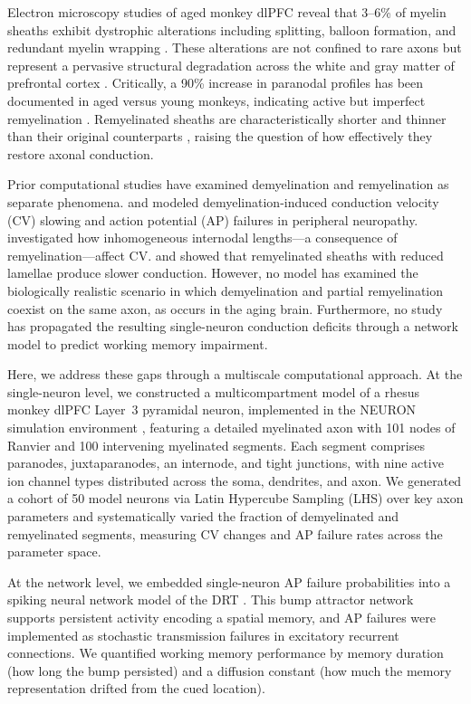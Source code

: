 \documentclass[11pt]{article}
\begin{document}
Electron microscopy studies of aged monkey dlPFC reveal that 3--6\% of myelin sheaths exhibit dystrophic alterations including splitting, balloon formation, and redundant myelin wrapping \citep{peters2002, bowley2010}. These alterations are not confined to rare axons but represent a pervasive structural degradation across the white and gray matter of prefrontal cortex \citep{peters2009}. Critically, a 90\% increase in paranodal profiles has been documented in aged versus young monkeys, indicating active but imperfect remyelination \citep{peters2009}. Remyelinated sheaths are characteristically shorter and thinner than their original counterparts \citep{lasiene2008, powers2012}, raising the question of how effectively they restore axonal conduction.

Prior computational studies have examined demyelination and remyelination as separate phenomena. \citet{stephanova2005} and \citet{stephanova2008} modeled demyelination-induced conduction velocity (CV) slowing and action potential (AP) failures in peripheral neuropathy. \citet{scurfield2018} investigated how inhomogeneous internodal lengths---a consequence of remyelination---affect CV. \citet{powers2012} and \citet{lasiene2008} showed that remyelinated sheaths with reduced lamellae produce slower conduction. However, no model has examined the biologically realistic scenario in which demyelination and partial remyelination coexist on the same axon, as occurs in the aging brain. Furthermore, no study has propagated the resulting single-neuron conduction deficits through a network model to predict working memory impairment.

Here, we address these gaps through a multiscale computational approach. At the single-neuron level, we constructed a multicompartment model of a rhesus monkey dlPFC Layer~3 pyramidal neuron, implemented in the NEURON simulation environment \citep{hines1997}, featuring a detailed myelinated axon with 101 nodes of Ranvier and 100 intervening myelinated segments. Each segment comprises paranodes, juxtaparanodes, an internode, and tight junctions, with nine active ion channel types distributed across the soma, dendrites, and axon. We generated a cohort of 50 model neurons via Latin Hypercube Sampling (LHS) over key axon parameters \citep{mckay1979} and systematically varied the fraction of demyelinated and remyelinated segments, measuring CV changes and AP failure rates across the parameter space.

At the network level, we embedded single-neuron AP failure probabilities into a spiking neural network model of the DRT \citep{compte2000, wang2001}. This bump attractor network supports persistent activity encoding a spatial memory, and AP failures were implemented as stochastic transmission failures in excitatory recurrent connections. We quantified working memory performance by memory duration (how long the bump persisted) and a diffusion constant (how much the memory representation drifted from the cued location).
\end{document}

